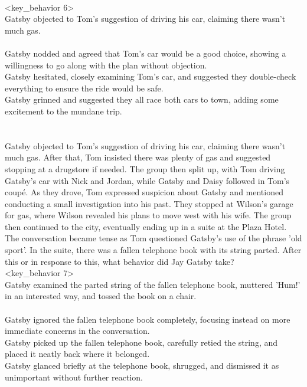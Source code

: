\begin{tcolorbox}[title = {Behavior Chain}, breakable]
\\<key\_behavior 6>\\
Gatsby objected to Tom's suggestion of driving his car, claiming there wasn't much gas.
\\<distracters 6>\\
Gatsby nodded and agreed that Tom's car would be a good choice, showing a willingness to go along with the plan without objection.\\
Gatsby hesitated, closely examining Tom's car, and suggested they double-check everything to ensure the ride would be safe.\\
Gatsby grinned and suggested they all race both cars to town, adding some excitement to the mundane trip.\\
\\<context 7>\\
Gatsby objected to Tom's suggestion of driving his car, claiming there wasn't much gas. After that, Tom insisted there was plenty of gas and suggested stopping at a drugstore if needed. The group then split up, with Tom driving Gatsby's car with Nick and Jordan, while Gatsby and Daisy followed in Tom's coupé. As they drove, Tom expressed suspicion about Gatsby and mentioned conducting a small investigation into his past. They stopped at Wilson's garage for gas, where Wilson revealed his plans to move west with his wife. The group then continued to the city, eventually ending up in a suite at the Plaza Hotel. The conversation became tense as Tom questioned Gatsby's use of the phrase 'old sport'. In the suite, there was a fallen telephone book with its string parted. After this or in response to this, what behavior did Jay Gatsby take?
\\<key\_behavior 7>\\
Gatsby examined the parted string of the fallen telephone book, muttered 'Hum!' in an interested way, and tossed the book on a chair.
\\<distracters 7>\\
Gatsby ignored the fallen telephone book completely, focusing instead on more immediate concerns in the conversation.\\
Gatsby picked up the fallen telephone book, carefully retied the string, and placed it neatly back where it belonged.\\
Gatsby glanced briefly at the telephone book, shrugged, and dismissed it as unimportant without further reaction.\\
\\<context 8>\\

\end{tcolorbox}

